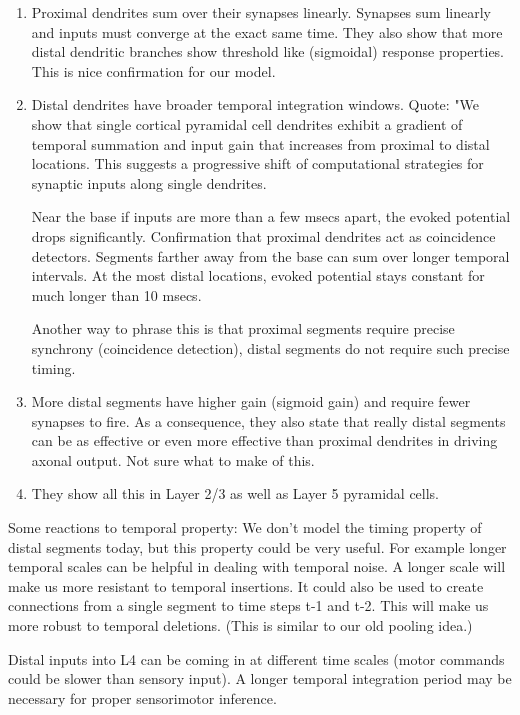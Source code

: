 \documentclass{article} %
\begin{document}
\begin{enumerate}

\item Proximal dendrites sum over their synapses linearly. Synapses sum linearly
and inputs must converge at the exact same time. They also show that more distal
dendritic branches show threshold like (sigmoidal) response properties. This is
nice confirmation for our model.

\item Distal dendrites have broader temporal integration windows. Quote: "We show
that single cortical pyramidal cell dendrites exhibit a gradient of temporal
summation and input gain that increases from proximal to distal locations. This
suggests a progressive shift of computational strategies for synaptic inputs
along single dendrites.

Near the base if inputs are more than a few msecs apart, the evoked potential
drops significantly. Confirmation that proximal dendrites act as coincidence
detectors. Segments farther away from the base can sum over longer temporal
intervals. At the most distal locations, evoked potential stays constant for
much longer than 10 msecs.

Another way to phrase this is that proximal segments require precise synchrony
(coincidence detection), distal segments do not require such precise timing.


\item More distal segments have higher gain (sigmoid gain) and require fewer
synapses to fire. As a consequence, they also state that really distal segments
can be as effective or even more effective than proximal dendrites in driving
axonal output. Not sure what to make of this.


\item They show all this in Layer 2/3 as well as Layer 5 pyramidal cells.

\end{enumerate}

Some reactions to temporal property: We don't model the timing property of
distal segments today, but this property could be very useful. For example
longer temporal scales can be helpful in dealing with temporal noise. A longer
scale will make us more resistant to temporal insertions. It could also be used
to create connections from a single segment to time steps t-1 and t-2. This will
make us more robust to temporal deletions. (This is similar to our old
pooling idea.)


Distal inputs into L4 can be coming in at different time scales (motor commands
could be slower than sensory input). A longer temporal integration period may be
necessary for proper sensorimotor inference.
\end{document}
